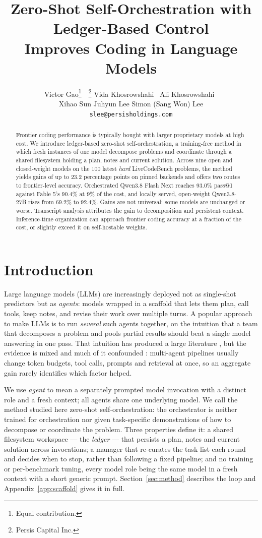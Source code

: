 \documentclass{article}
\title{Zero-Shot Self-Orchestration with Ledger-Based Control \\
Improves Coding in Language Models}
\author{%
  Victor Gao\thanks{Equal contribution.}\ \ \thanks{Persis Capital Inc.} \quad
  Vida Khosrowshahi\footnotemark[1]\ \footnotemark[2] \quad
  Ali Khosrowshahi\footnotemark[1]\ \footnotemark[2] \\
  Xihao Sun\footnotemark[2] \quad
  Juhyun Lee \quad
  Simon (Sang Won) Lee\footnotemark[2] \\
  \texttt{slee@persisholdings.com}
}
\newif\ifcameraready
\begin{document}
\maketitle
\ifcameraready\else{}\fi

\begin{abstract}
Frontier coding performance is typically bought with larger proprietary models at high
cost. We introduce ledger-based zero-shot self-orchestration, a training-free method in
which fresh instances of one model decompose problems and coordinate through a shared
filesystem holding a plan, notes and current solution. Across nine open and closed-weight
models on the 100 latest \emph{hard} LiveCodeBench problems, the method yields gains of up
to 23.2 percentage points on pinned backends and offers two routes to frontier-level
accuracy. Orchestrated Qwen3.8 Flash Next reaches 93.0\% pass@1 against Fable 5's 90.4\% at 9\%
of the cost, and locally served, open-weight Qwen3.8-27B rises from 69.2\% to 92.4\%. 
Gains are not universal: some models are unchanged or worse.
Transcript analysis attributes the gain to decomposition and persistent context.
Inference-time organization can approach frontier coding accuracy at a fraction of the cost,
or slightly exceed it on self-hostable weights.
\end{abstract}

\section{Introduction}
\label{sec:intro}

Large language models (LLMs) are increasingly deployed not as single-shot predictors but as
\emph{agents}: models wrapped in a scaffold that lets them plan, call tools, keep notes,
and revise their work over multiple turns. A popular approach to make LLMs is to run \emph{several}
such agents together, on the intuition that a team that decomposes a problem and pools
partial results should beat a single model answering in one pass. That intuition has
produced a large literature \citep{guo2024}, but the evidence is mixed \citep{wangq2024}
and much of it confounded \citep{tran2026}: multi-agent pipelines usually change token
budgets, tool calls, prompts and retrieval at once, so an aggregate gain rarely identifies
which factor helped.

We use \emph{agent} to mean a separately prompted model invocation with a distinct role and
a fresh context; all agents share one underlying model. We call the method studied here
zero-shot self-orchestration: the orchestrator is neither trained for orchestration nor
given task-specific demonstrations of how to decompose or coordinate the problem. Three
properties define it: a shared filesystem workspace --- the \emph{ledger} --- that persists
a plan, notes and current solution across invocations; a manager that re-curates the task
list each round and decides when to stop, rather than following a fixed pipeline; and no
training or per-benchmark tuning, every model role being the same model in a fresh context
with a short generic prompt. Section~\ref{sec:method} describes the loop and
Appendix~\ref{app:scaffold} gives it in full.
\end{document}
